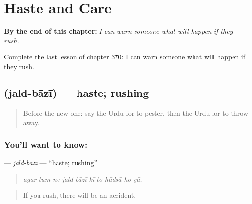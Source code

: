 
\chapter{Haste and Care}
\label{ch:ur-haste-and-care}

\begin{chapteropening}
\textbf{By the end of this chapter:} \emph{I can warn someone what will happen if they rush.}

Complete the last lesson of chapter 370: I can warn someone what will happen if they rush.
\end{chapteropening}

\section[\texorpdfstring{\ur{جلد} \ur{بازی} (jald-bāzī)}{جلد بازی (jald-bāzī)}]{  (jald-bāzī) — haste; rushing}

\label{lesson:UR-C370-jald-bazi}



\begin{quote}
Before the new one: say the Urdu for to pester, then the Urdu for to throw away.
\end{quote}

\subsection*{You'll want to know:  }
\textbf{ } — \emph{jald-bāzī} — \textquotedblleft{}haste; rushing\textquotedblright{}.

\begin{quote}
         
\end{quote}

\begin{quote}
\emph{agar tum ne jald-bāzī kī to hādsā ho gā.}
\end{quote}

\begin{quote}
If you rush, there will be an accident.
\end{quote}

